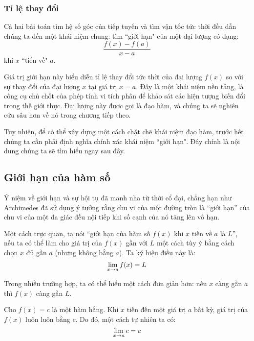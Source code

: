 \subsubsection{Tỉ lệ thay đổi}

Cả hai bài toán tìm hệ số góc của tiếp tuyến và tìm vận tốc tức thời đều dẫn chúng ta đến một khái niệm chung: tìm ``giới hạn" của một đại lượng có dạng:
\begin{equation*}
    \dfrac{f(x) - f(a)}{x - a}
\end{equation*}
khi $x$ ``tiến về" $a$.

Giá trị giới hạn này biểu diễn tỉ lệ thay đổi tức thời của đại lượng $f(x)$ so với sự thay đổi của đại lượng $x$ tại giá trị $x=a$. Đây là một khái niệm nền tảng, là công cụ chủ chốt của phép tính vi tích phân để khảo sát các hiện tượng biến đổi trong thế giới thực. Đại lượng này được gọi là đạo hàm, và chúng ta sẽ nghiên cứu sâu hơn về nó trong chương tiếp theo.

Tuy nhiên, để có thể xây dựng một cách chặt chẽ khái niệm đạo hàm, trước hết chúng ta cần phải định nghĩa chính xác khái niệm ``giới hạn". Đây chính là nội dung chúng ta sẽ tìm hiểu ngay sau đây.


\subsection{Giới hạn của hàm số}
\label{subsec:dinh-nghia-gioi-han}

Ý niệm về giới hạn và sự hội tụ đã manh nha từ thời cổ đại, chẳng hạn như Archimedes đã sử dụng ý tưởng rằng chu vi của một đường tròn là ``giới hạn'' của chu vi của một đa giác đều nội tiếp khi số cạnh của nó tăng lên vô hạn.

Một cách trực quan, ta nói ``giới hạn của hàm số $f(x)$ khi $x$ tiến về $a$ là $L$'', nếu ta có thể làm cho giá trị của $f(x)$ gần với $L$ một cách tùy ý bằng cách chọn $x$ đủ gần $a$ (nhưng không bằng $a$). Ta ký hiệu điều này là:
\begin{equation*}
    \lim\limits_{x \to a} f(x) = L
\end{equation*}

Trong nhiều trường hợp, ta có thể hiểu một cách đơn giản hơn: nếu $x$ càng gần $a$ thì $f(x)$ càng gần $L$.

\begin{example}
    Cho $f(x) = c$ là một hàm hằng. Khi $x$ tiến đến một giá trị $a$ bất kỳ, giá trị của $f(x)$ luôn luôn bằng $c$. Do đó, một cách tự nhiên ta có:
    \begin{equation*}
        \lim\limits_{x \to a} c = c
    \end{equation*}
\end{example}

